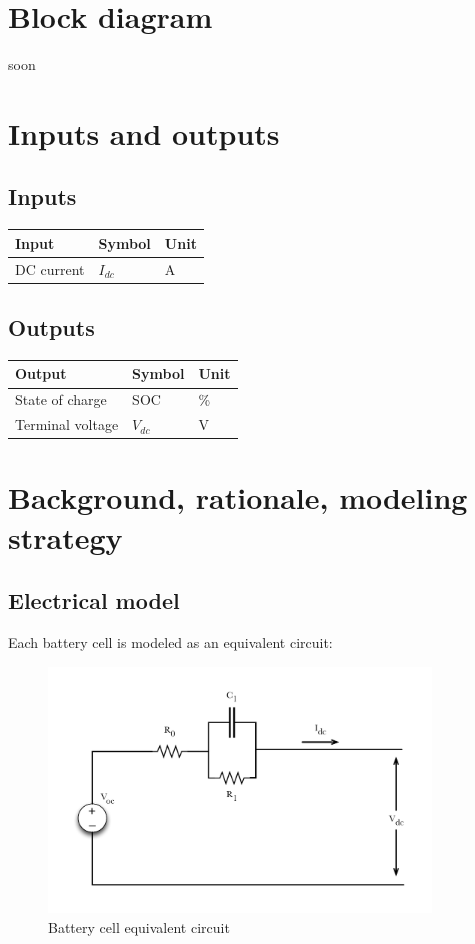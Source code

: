 \documentclass[../SimBALink.tex]{subfiles}
\begin{document}
\section{Block diagram}
soon

\section{Inputs and outputs}
	\subsection{Inputs}
	\begin{tabular}{ l | l | l  }
		Input					&	Symbol		&	Unit		\\	\hline
		DC current				&	$I_{dc}$		&	A		\\
	\end{tabular}
	
	\subsection{Outputs}
	\begin{tabular}{ l | l | l  }
		Output					&	Symbol		&	Unit		\\	\hline
		State of charge			&	SOC			&	\%		\\
		Terminal voltage			&	$V_{dc}$		&	V		\\
	\end{tabular}
	
\section{Background, rationale, modeling strategy}
	\subsection{Electrical model}
		Each battery cell is modeled as an equivalent circuit:
		
		\begin{figure}[h!]
				\centering
				\includegraphics[width=4in]{Battery_pack_equivalent_circuit}
				\caption{Battery cell equivalent circuit}
				\label{fig:battery_pack_equivalent_circuit}
		\end{figure}
		\FloatBarrier
		
\end{document}

